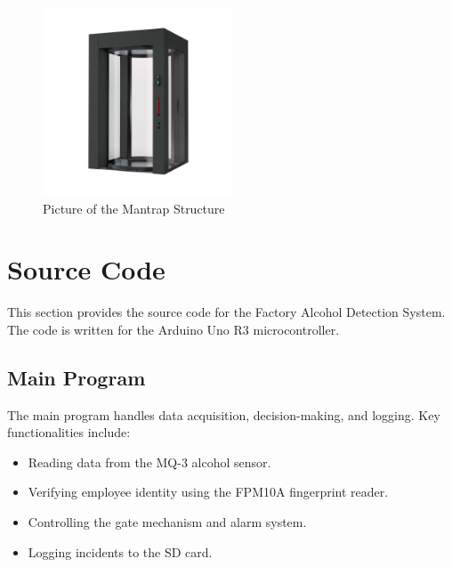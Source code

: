 \begin{figure}[H]
    \centering
    \includegraphics[width=0.5\textwidth]{images/mantrap_drawing.png}
    \caption{Picture of the Mantrap Structure}
    \label{fig:mantrap_drawing}
\end{figure}


\section{Source Code}
\label{app:source_code}

This section provides the source code for the Factory Alcohol Detection System. The code is written for the Arduino Uno R3 microcontroller.

\subsection{Main Program}
The main program handles data acquisition, decision-making, and logging. Key functionalities include:
\begin{itemize}
    \item Reading data from the MQ-3 alcohol sensor.
    \item Verifying employee identity using the FPM10A fingerprint reader.
    \item Controlling the gate mechanism and alarm system.
    \item Logging incidents to the SD card.
\end{itemize}

